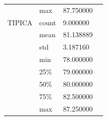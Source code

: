 \begin{table}[H]
\begin{tabular}{llll}
		&max      & 87.750000                                     &  \\
		TIPICA   & count                              & 9.000000   &  \\
		&mean     & 81.138889                                      &  \\
		&std      & 3.187160                                       &  \\
		&min      & 78.000000                                      &  \\
		&25\%     & 79.000000                                      &  \\
		&50\%     & 80.000000                                      &  \\
		&75\%     & 82.500000                                      &  \\
		&max      & 87.250000                  &  
	\end{tabular}
\end{table}


